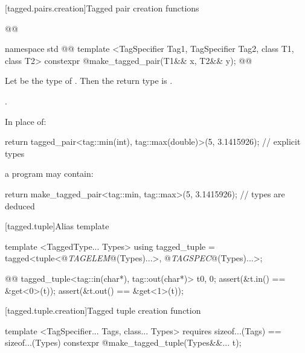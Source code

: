 {[tagged.pairs.creation]{Tagged pair creation functions}

%
\begin{itemdecl}
@@

namespace std { @@
  template <TagSpecifier Tag1, TagSpecifier Tag2, class T1, class T2>
    constexpr @\seebelow@ make_tagged_pair(T1&& x, T2&& y);
}@\oldtxt{\}\}\}}@
\end{itemdecl}

\begin{itemdescr}
\pnum
Let  be the type of .
Then the return type is .

\pnum
\returns {}.

\pnum
\enterexample
In place of:

\begin{codeblock}
  return tagged_pair<tag::min(int), tag::max(double)>(5, 3.1415926);   // explicit types
\end{codeblock}

a \Cpp program may contain:

\begin{codeblock}
  return make_tagged_pair<tag::min, tag::max>(5, 3.1415926);           // types are deduced
\end{codeblock}
\exitexample
\end{itemdescr}

[tagged.tuple]{Alias template }

\pnum
\begin{codeblock}
template <TaggedType... Types>
using tagged_tuple = tagged<tuple<@\textit{TAGELEM}@(Types)...>,
                            @\textit{TAGSPEC}@(Types)...>;
\end{codeblock}

\pnum
\enterexample
\begin{codeblock}
@@
tagged_tuple<tag::in(char*), tag::out(char*)> t{0, 0};
assert(&t.in() == &get<0>(t));
assert(&t.out() == &get<1>(t));
\end{codeblock}
\exitexample

[tagged.tuple.creation]{Tagged tuple creation function}

%
%
\begin{itemdecl}
template <TagSpecifier... Tags, class... Types>
  requires sizeof...(Tags) == sizeof...(Types)
    constexpr @\seebelow@ make_tagged_tuple(Types&&... t);
\end{itemdecl}

}
